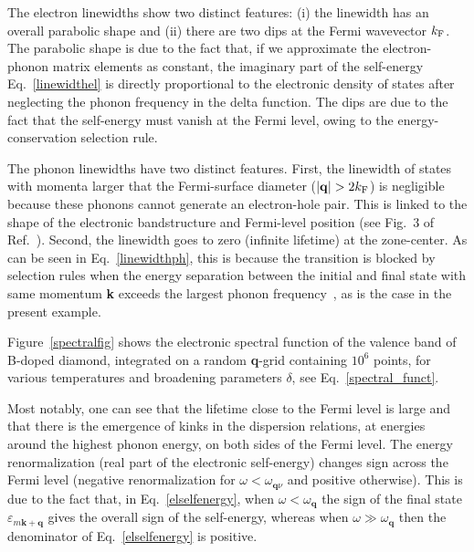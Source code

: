 \documentclass[final,3p,times,twocolumn]{elsarticle}
\begin{document}
The electron linewidths show two distinct features: (i) the linewidth has an overall parabolic shape and (ii) there are two dips at the Fermi wavevector $k_{\rm F}$. 
The parabolic shape is due to the fact that, if we approximate the electron-phonon matrix elements as constant, the imaginary part of the self-energy Eq.~\eqref{linewidthel} is directly proportional to the electronic density of states after neglecting the phonon frequency in the delta function. The dips are due to the fact that the self-energy must vanish at the Fermi level, owing to the energy-conservation selection rule.



The phonon linewidths have two distinct features. First, the linewidth of states with momenta larger that the Fermi-surface diameter ($|\mathbf{q}|> 2k_{\rm F}$) is negligible because these phonons cannot generate an electron-hole pair.
This is linked to the shape of the electronic bandstructure and Fermi-level position (see Fig.~3 of Ref.~\cite{Giustino2007}). Second, the linewidth goes to zero (infinite lifetime) at the zone-center. As can be seen in Eq.~\eqref{linewidthph}, this is because the transition is blocked by selection rules when the energy separation between the initial and final state with same momentum \textbf{k} exceeds the largest phonon frequency~\cite{Giustino2007a,Calandra2005}, as is the case in the present example.


Figure~\ref{spectralfig} shows the electronic spectral function of the valence band of B-doped diamond, integrated on a random \textbf{q}-grid containing $10^6$ points, for various temperatures and broadening parameters $\delta$, see Eq.~\eqref{spectral_funct}. 

Most notably, one can see that the lifetime close to the Fermi level is large and that there is the emergence of kinks in the dispersion relations, at energies around the highest phonon energy, on both sides of the Fermi level. The energy renormalization (real part of the electronic self-energy) changes sign across the Fermi level (negative renormalization for $\omega < \omega_{\mathbf{q}\nu}$ and positive otherwise).
This is due to the fact that, in Eq.~\eqref{elselfenergy}, when $\omega <  \omega_{\mathbf{q}}$ the sign of the final state $\varepsilon_{m\mathbf{k+q}}$ gives the overall sign of the self-energy, whereas when $\omega \gg  \omega_{\mathbf{q}}$ then the denominator of Eq.~\eqref{elselfenergy} is positive. 
\end{document}
